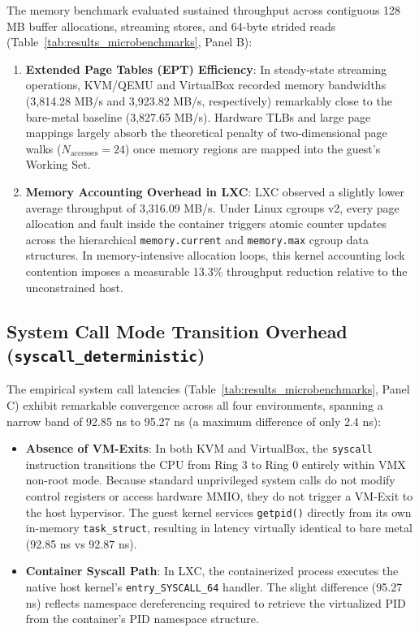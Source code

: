 The memory benchmark evaluated sustained throughput across contiguous 128 MB buffer allocations, streaming stores, and 64-byte strided reads (Table~\ref{tab:results_microbenchmarks}, Panel B):
\begin{enumerate}
    \item \textbf{Extended Page Tables (EPT) Efficiency}: In steady-state streaming operations, KVM/QEMU and VirtualBox recorded memory bandwidths (3,814.28 MB/s and 3,923.82 MB/s, respectively) remarkably close to the bare-metal baseline (3,827.65 MB/s). Hardware TLBs and large page mappings largely absorb the theoretical penalty of two-dimensional page walks ($N_{\text{accesses}} = 24$) once memory regions are mapped into the guest's Working Set.
    \item \textbf{Memory Accounting Overhead in LXC}: LXC observed a slightly lower average throughput of 3,316.09 MB/s. Under Linux cgroups v2, every page allocation and fault inside the container triggers atomic counter updates across the hierarchical \texttt{memory.current} and \texttt{memory.max} cgroup data structures. In memory-intensive allocation loops, this kernel accounting lock contention imposes a measurable 13.3\% throughput reduction relative to the unconstrained host.
\end{enumerate}

\subsection{System Call Mode Transition Overhead (\texttt{syscall\_deterministic})}
\label{subsec:results_syscall}

The empirical system call latencies (Table~\ref{tab:results_microbenchmarks}, Panel C) exhibit remarkable convergence across all four environments, spanning a narrow band of 92.85 ns to 95.27 ns (a maximum difference of only 2.4 ns):
\begin{itemize}
    \item \textbf{Absence of VM-Exits}: In both KVM and VirtualBox, the \texttt{syscall} instruction transitions the CPU from Ring 3 to Ring 0 entirely within VMX non-root mode. Because standard unprivileged system calls do not modify control registers or access hardware MMIO, they do not trigger a VM-Exit to the host hypervisor. The guest kernel services \texttt{getpid()} directly from its own in-memory \texttt{task\_struct}, resulting in latency virtually identical to bare metal (92.85 ns vs 92.87 ns).
    \item \textbf{Container Syscall Path}: In LXC, the containerized process executes the native host kernel's \texttt{entry\_}\allowbreak\texttt{SYSCALL\_}\allowbreak\texttt{64} handler. The slight difference (95.27 ns) reflects namespace dereferencing required to retrieve the virtualized PID from the container's PID namespace structure.
\end{itemize}


